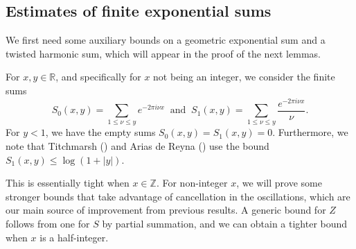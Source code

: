 \documentclass[11pt,letterpaper,oneside,reqno]{amsart}
\renewcommand{\^}[1]{\widehat{#1}}
\newcommand{\R}{{\mathbb{R}}}
\newcommand{\Z}{{\mathbb{Z}}}
\numberwithin{equation}{section}
\theoremstyle{remark}
\begin{document}
\subsection{Estimates of finite exponential sums}
%
We first need some auxiliary bounds on a geometric exponential sum and a twisted harmonic sum, which will appear in the proof of the next lemmas. 
\smallskip

For $x,y\in\R$, and specifically for $x$ not being an integer, we consider the finite sums 
    \begin{equation}
    \label{def-Sxy}
        S_0(x,y) = \sum_{1\leq \nu\leq y} {e^{-2\pi i \nu x}} \ \text{ and }\  
        S_1(x,y) = \sum_{1\leq \nu\leq y} \frac{e^{-2\pi i \nu x}}{\nu}.
\end{equation}
%
For $y<1$, we have the empty sums $S_0(x,y)=S_1(x,y)=0.$ Furthermore, we note that Titchmarsh (\cite{Titchmarsh}) and Arias de Reyna (\cite{dereyna2024approximationzetafunctiondirichlet}) use the bound $S_1(x,y) \leq  \log (1+|y|)$. 

\smallskip
This is essentially tight when $x\in\Z$. For non-integer $x$, we will prove some stronger bounds that take advantage of cancellation in the oscillations, which are our main source of improvement from previous results. A generic bound for $Z$ follows from one for $S$ by partial summation, and we can obtain a tighter bound when $x$ is a half-integer. 
\end{document}
